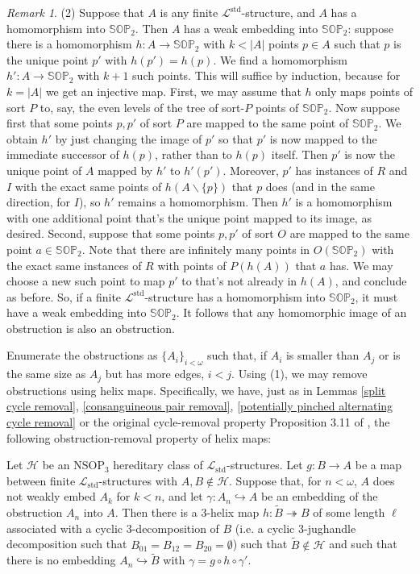\documentclass{amsart}
\theoremstyle{definition}
\theoremstyle{remark}
\newtheorem{remark}[theorem]{Remark}
\numberwithin{equation}{section}
\begin{document}
\begin{remark}
(2) Suppose that $A$ is any finite $\mathcal{L}^{\mathrm{std}}$-structure, and $A$ has a homomorphism into $\mathbb{SOP}_{2}$. Then $A$ has a weak embedding into $\mathbb{SOP}_{2}$: suppose there is a homomorphism $h: A \to \mathbb{SOP}_{2}$ with $k < |A|$ points $ p \in A$ such that $p$ is the unique point $p'$ with $h(p')=h(p)$. We find a homomorphism $h': A \to \mathbb{SOP}_{2}$ with $k+1$ such points. This will suffice by induction, because for $k = |A|$ we get an injective map.  First, we may assume that $h$ only maps points of sort $P$ to, say, the even levels of the tree of sort-$P$ points of $\mathbb{SOP}_{2}$. Now suppose first that some points $p, p'$ of sort $P$ are mapped to the same point of $\mathbb{SOP}_{2}$. We  obtain $h'$ by just changing the image of $p'$ so that $p'$ is now mapped to the immediate successor of $h(p)$, rather than to $h(p)$ itself. Then $p'$ is now the unique point of $A$ mapped by $h'$ to $h'(p')$. Moreover, $p'$ has instances of $R$ and $I$ with the exact same points of  $h(A \backslash \{p\})$ that $p$ does (and in the same direction, for $I$), so $h'$ remains a homomorphism. Then $h'$ is a homomorphism with one additional point that's the unique point mapped to its image, as desired. Second, suppose that some points $p, p'$ of sort $O$ are mapped to the same point $a \in \mathbb{SOP}_{2}$. Note that there are infinitely many points in $O(\mathbb{SOP}_{2})$ with the exact same instances of $R$ with points of $P(h(A))$ that $a$ has. We may choose a new such point to map $p'$ to that's not already in $h(A)$, and conclude as before. So, if a finite $\mathcal{L}^{\mathrm{std}}$-structure has a homomorphism into $\mathbb{SOP}_{2}$, it must have a weak embedding into $\mathbb{SOP}_{2}$. It follows that any homomorphic image of an obstruction is also an obstruction.

Enumerate the obstructions as $\{A_i\}_{i< \omega}$ such that, if $A_{i}$ is smaller than $A_{j}$ or is the same size as $A_{j}$ but has more edges, $i < j$. Using (1), we may remove obstructions using helix maps. Specifically, we have, just as in Lemmas \ref{split cycle removal}, \ref{consanguineous pair removal}, \ref{potentially pinched alternating cycle removal} or the original cycle-removal property Proposition 3.11 of \cite{ApproxOrder}, the following obstruction-removal property of helix maps:

Let $\mathcal{H}$ be an $\mathrm{NSOP}_{3}$ hereditary class of $\mathcal{L}_{\mathrm{std}}$-structures. Let $g: B \to A$ be a map between finite $\mathcal{L}_{\mathrm{std}}$-structures with $A, B\notin \mathcal{H}$. Suppose that, for $n < \omega$, $A$ does not weakly embed $A_{k}$ for $k < n$, and let $\gamma: A_{n} \hookrightarrow A$ be an embedding of the obstruction $A_{n}$ into $A$.  Then there is a $3$-helix map $h: \tilde{B} \twoheadrightarrow B$ of some length $\ell$ associated with a cyclic $3$-decomposition of $B$ (i.e. a cyclic $3$-jughandle decomposition such that $B_{01}=B_{12}=B_{20}=\emptyset$) such that $\tilde{B} \notin \mathcal{H}$ and such that there is no embedding $A_{n} \hookrightarrow \tilde{B}$ with $\gamma = g\circ h\circ \gamma'$.



\end{remark}
\end{document}
